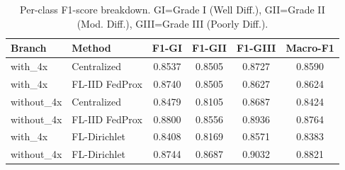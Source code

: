 \begin{table}
\caption{Per-class F1-score breakdown. GI=Grade I (Well Diff.), GII=Grade II (Mod. Diff.), GIII=Grade III (Poorly Diff.).}
\label{tab:colon5_f1_breakdown}
\begin{tabular}{llcccc}
\toprule
Branch & Method & F1-GI & F1-GII & F1-GIII & Macro-F1 \\
\midrule
with_4x & Centralized & 0.8537 & 0.8505 & 0.8727 & 0.8590 \\
with_4x & FL-IID FedProx & 0.8740 & 0.8505 & 0.8627 & 0.8624 \\
without_4x & Centralized & 0.8479 & 0.8105 & 0.8687 & 0.8424 \\
without_4x & FL-IID FedProx & 0.8800 & 0.8556 & 0.8936 & 0.8764 \\
with_4x & FL-Dirichlet & 0.8408 & 0.8169 & 0.8571 & 0.8383 \\
without_4x & FL-Dirichlet & 0.8744 & 0.8687 & 0.9032 & 0.8821 \\
\bottomrule
\end{tabular}
\end{table}
